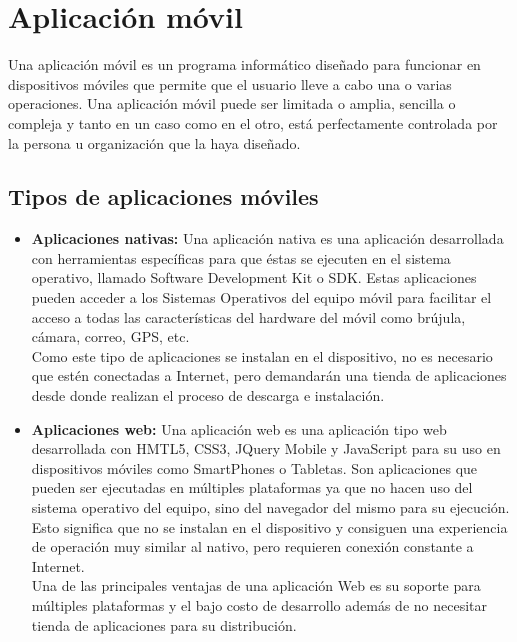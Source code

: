 \section{Aplicación móvil}
Una aplicación móvil es un programa informático diseñado para funcionar en dispositivos móviles que permite que el usuario lleve a cabo una o varias operaciones. Una aplicación móvil puede ser limitada o amplia, sencilla o compleja y tanto en un caso como en el otro, está perfectamente controlada por la persona u organización que la haya diseñado.\\

\subsection{Tipos de aplicaciones móviles}
\begin{itemize}
	\item \textbf{Aplicaciones nativas:} Una aplicación nativa es una aplicación desarrollada con herramientas específicas para que éstas se ejecuten en el sistema operativo, llamado Software Development Kit o SDK. Estas aplicaciones pueden acceder a los Sistemas Operativos del equipo móvil para facilitar el acceso a todas las características del hardware del móvil como brújula, cámara, correo, GPS, etc.\\ 
	
	Como este tipo de aplicaciones se instalan en el dispositivo, no es necesario que estén  conectadas a Internet, pero demandarán una tienda de aplicaciones desde donde realizan el proceso de descarga e instalación.
	
	\item \textbf{Aplicaciones web:} Una aplicación web es una aplicación tipo web desarrollada con HMTL5, CSS3, JQuery Mobile y JavaScript para su uso en dispositivos móviles como SmartPhones o Tabletas. Son aplicaciones que pueden ser ejecutadas en múltiples plataformas ya que no hacen uso del sistema operativo del equipo, sino del navegador del mismo para su ejecución. Esto significa que no se instalan en el dispositivo y consiguen una experiencia de operación muy similar al nativo, pero requieren conexión constante a Internet. \\
	
	Una de las principales ventajas de una aplicación Web es su soporte para múltiples plataformas y el bajo costo de desarrollo además de no necesitar tienda de aplicaciones para su distribución.
	
\end{itemize}